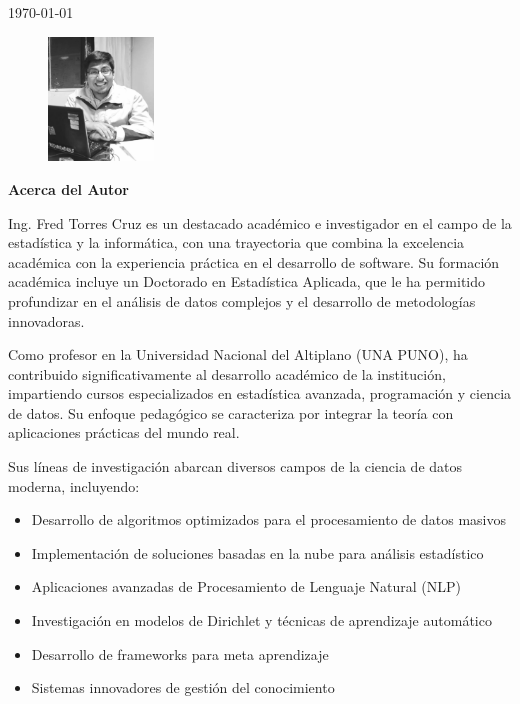 \documentclass[12pt, a4paper, oneside]{book}
\begin{document}
	
	\begin{titlepage}
		\vspace{15cm}
		\today
	\end{titlepage}
	
	\begin{figure}
		\vspace{-20pt}
		\includegraphics[width=0.25\textwidth]{fred (1).jpg}
	\end{figure}
	
	\noindent\textbf{Acerca del Autor}
	
	\noindent Ing. Fred Torres Cruz es un destacado académico e investigador en el campo de la estadística y la informática, con una trayectoria que combina la excelencia académica con la experiencia práctica en el desarrollo de software. Su formación académica incluye un Doctorado en Estadística Aplicada, que le ha permitido profundizar en el análisis de datos complejos y el desarrollo de metodologías innovadoras.
	
	\medskip
	\noindent Como profesor en la Universidad Nacional del Altiplano (UNA PUNO), ha contribuido significativamente al desarrollo académico de la institución, impartiendo cursos especializados en estadística avanzada, programación y ciencia de datos. Su enfoque pedagógico se caracteriza por integrar la teoría con aplicaciones prácticas del mundo real.
	
	\medskip
	\noindent Sus líneas de investigación abarcan diversos campos de la ciencia de datos moderna, incluyendo:
	
	\begin{itemize}
		\item Desarrollo de algoritmos optimizados para el procesamiento de datos masivos
		\item Implementación de soluciones basadas en la nube para análisis estadístico
		\item Aplicaciones avanzadas de Procesamiento de Lenguaje Natural (NLP)
		\item Investigación en modelos de Dirichlet y técnicas de aprendizaje automático
		\item Desarrollo de frameworks para meta aprendizaje
		\item Sistemas innovadores de gestión del conocimiento
	\end{itemize}
	
\end{document}
